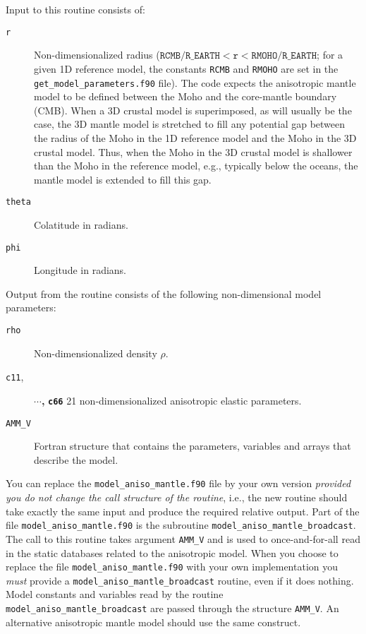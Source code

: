 \noindent
Input to this routine consists of:
\begin{description}
\item [{\texttt{r}}] Non-dimensionalized radius ($\texttt{RCMB/R\_ EARTH}<\texttt{r}<\texttt{RMOHO/R\_ EARTH}$;
for a given 1D reference model, the constants \texttt{RCMB} and \texttt{RMOHO}
are set in the \texttt{\small get\_model\_parameters}\texttt{.f90}
file). The code expects the anisotropic mantle model to be defined
between the Moho and the core-mantle boundary (CMB). When a 3D crustal
model is superimposed, as will usually be the case, the 3D mantle
model is stretched to fill any potential gap between the radius of
the Moho in the 1D reference model and the Moho in the 3D crustal
model. Thus, when the Moho in the 3D crustal model is shallower than
the Moho in the reference model, e.g., typically below the oceans,
the mantle model is extended to fill this gap.
\item [{\texttt{theta}}] Colatitude in radians.
\item [{\texttt{phi}}] Longitude in radians.
\end{description}
%
Output from the routine consists of the following non-dimensional
model parameters:
\begin{description}
\item [{\texttt{rho}}] Non-dimensionalized density $\rho$.
\item [{\texttt{c11},}] \textbf{$\cdots$,} \texttt{\textbf{c66}} 21 non-dimensionalized
anisotropic elastic parameters.
\item [{\texttt{AMM\_V}}] Fortran structure that contains the parameters,
variables and arrays that describe the model.
\end{description}
You can replace the \texttt{model\_aniso\_mantle.f90} file by
your own version \textit{provided you do not change the call structure
of the routine}, i.e., the new routine should take exactly the same
input and produce the required relative output. Part of the file \texttt{model\_aniso\_mantle.f90}
is the subroutine \texttt{model\_aniso\_mantle\_broadcast}. The call to
this routine takes argument \texttt{AMM\_V} and is used to once-and-for-all
read in the static databases related to the anisotropic model. When
you choose to replace the file \texttt{model\_aniso\_mantle.f90}
with your own implementation you \textit{must} provide a \texttt{model\_aniso\_mantle\_broadcast}
routine, even if it does nothing. Model constants and variables read
by the routine \texttt{model\_aniso\_mantle\_broadcast} are passed through the
structure \texttt{AMM\_V}. An alternative anisotropic mantle model
should use the same construct.\newline


